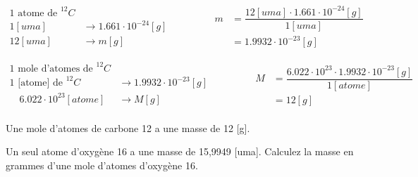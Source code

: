 \documentclass[
  11pt,
  french,
  a4paper,
  openany]{book}
\begin{document}
\begin{Answer}
\[ \begin{split}
    \text{1 atome de } ^{12}C &\\
    1 [uma] &\longrightarrow 1.661\cdot10^{-24} [g]\\
    12 [uma] &\longrightarrow m [g]
    \end{split}
    \qquad\qquad
    \begin{split}
        m &= \dfrac{12 [uma] \cdot 1.661 \cdot 10^{-24} [g]}{1 [uma]}\\
        &= 1.9932\cdot 10^{-23} [g]     
    \end{split} \]

\[ \begin{split}
        \text{1 mole d'atomes de }^{12}C &\\
        \text{1 [atome] de }^{12}C &\longrightarrow 1.9932\cdot 10^{-23} [g]\\
        \quad 6.022\cdot 10^{23} [atome] &\longrightarrow M [g]\\
    \end{split}
    \qquad\qquad
    \begin{split}
    M &= \dfrac{6.022\cdot 10^{23} \cdot 1.9932\cdot 10^{-23} [g]}{1 [atome]}\\
    &= 12 [g]
    \end{split} \]

Une mole d'atomes de carbone 12 a une masse de 12 {[}g{]}.

\end{Answer}

\begin{Exercise}

Un seul atome d'oxygène 16 a une masse de 15,9949 {[}uma{]}. Calculez la masse en grammes d'une mole d'atomes d'oxygène 16.



\end{Exercise}
\end{document}
